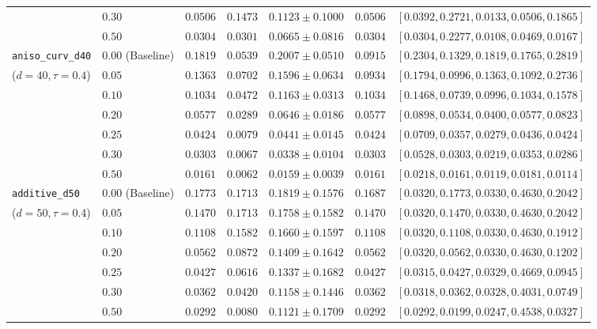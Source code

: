 \documentclass[11pt,a4paper]{article}
\theoremstyle{definition}
\theoremstyle{remark}
\begin{document}
\begin{table}[ht!]
{\begin{tabular}{@{}llrrrrl@{}}
 & $0.30$ & $\mathbf{0.0506}$ & $0.1473$ & $\mathbf{0.1123 \pm 0.1000}$ & $0.0506$ & $[0.0392, 0.2721, 0.0133, 0.0506, 0.1865]$ \\
 & $0.50$ & $\mathbf{0.0304}$ & $\mathbf{0.0301}$ & $\mathbf{0.0665 \pm 0.0816}$ & $\mathbf{0.0304}$ & $[0.0304, 0.2277, 0.0108, 0.0469, 0.0167]$ \\
\midrule
\texttt{aniso\_curv\_d40} & $0.00$ (Baseline) & $0.1819$ & $0.0539$ & $0.2007 \pm 0.0510$ & $0.0915$ & $[0.2304, 0.1329, 0.1819, 0.1765, 0.2819]$ \\
($d=40, \tau=0.4$) & $0.05$ & $0.1363$ & $0.0702$ & $0.1596 \pm 0.0634$ & $0.0934$ & $[0.1794, 0.0996, 0.1363, 0.1092, 0.2736]$ \\
 & $0.10$ & $0.1034$ & $0.0472$ & $0.1163 \pm 0.0313$ & $0.1034$ & $[0.1468, 0.0739, 0.0996, 0.1034, 0.1578]$ \\
 & $0.20$ & $0.0577$ & $0.0289$ & $0.0646 \pm 0.0186$ & $0.0577$ & $[0.0898, 0.0534, 0.0400, 0.0577, 0.0823]$ \\
 & $0.25$ & $0.0424$ & $0.0079$ & $0.0441 \pm 0.0145$ & $0.0424$ & $[0.0709, 0.0357, 0.0279, 0.0436, 0.0424]$ \\
 & $0.30$ & $\mathbf{0.0303}$ & $0.0067$ & $\mathbf{0.0338 \pm 0.0104}$ & $0.0303$ & $[0.0528, 0.0303, 0.0219, 0.0353, 0.0286]$ \\
 & $0.50$ & $\mathbf{0.0161}$ & $\mathbf{0.0062}$ & $\mathbf{0.0159 \pm 0.0039}$ & $\mathbf{0.0161}$ & $[0.0218, 0.0161, 0.0119, 0.0181, 0.0114]$ \\
\midrule
\texttt{additive\_d50} & $0.00$ (Baseline) & $0.1773$ & $0.1713$ & $0.1819 \pm 0.1576$ & $0.1687$ & $[0.0320, 0.1773, 0.0330, 0.4630, 0.2042]$ \\
($d=50, \tau=0.4$) & $0.05$ & $0.1470$ & $0.1713$ & $0.1758 \pm 0.1582$ & $0.1470$ & $[0.0320, 0.1470, 0.0330, 0.4630, 0.2042]$ \\
 & $0.10$ & $0.1108$ & $0.1582$ & $0.1660 \pm 0.1597$ & $0.1108$ & $[0.0320, 0.1108, 0.0330, 0.4630, 0.1912]$ \\
 & $0.20$ & $0.0562$ & $0.0872$ & $0.1409 \pm 0.1642$ & $0.0562$ & $[0.0320, 0.0562, 0.0330, 0.4630, 0.1202]$ \\
 & $0.25$ & $0.0427$ & $0.0616$ & $0.1337 \pm 0.1682$ & $0.0427$ & $[0.0315, 0.0427, 0.0329, 0.4669, 0.0945]$ \\
 & $0.30$ & $\mathbf{0.0362}$ & $0.0420$ & $\mathbf{0.1158 \pm 0.1446}$ & $0.0362$ & $[0.0318, 0.0362, 0.0328, 0.4031, 0.0749]$ \\
 & $0.50$ & $\mathbf{0.0292}$ & $\mathbf{0.0080}$ & $\mathbf{0.1121 \pm 0.1709}$ & $\mathbf{0.0292}$ & $[0.0292, 0.0199, 0.0247, 0.4538, 0.0327]$ \\
\bottomrule
\end{tabular}%
}
\end{table}
\end{document}
